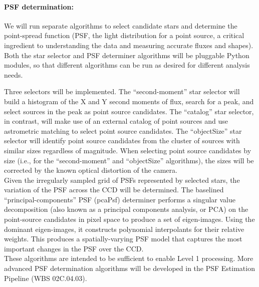 \documentclass[12pt]{article}
\newcommand{\wbsPSF}{WBS 02C.04.03}
\begin{document}
\paragraph{PSF determination:} We will run separate algorithms to select candidate stars and determine the point-spread function (PSF, the light distribution for a point source, a critical ingredient to understanding the data and measuring accurate fluxes and shapes).  Both the star selector and PSF determiner algorithms will be pluggable Python modules, so that different algorithms can be run as desired for different analysis needs.

Three selectors will be implemented. %
The ``second-moment'' star selector will build a histogram of the X and Y second moments of flux, search for a peak, and select sources in the peak as point source candidates.  The ``catalog'' star selector, in contrast, will make use of an external catalog of point sources and use astrometric matching to select point source candidates.  The ``objectSize'' star selector will identify point source candidates from the cluster of sources with similar sizes regardless of magnitude.  When selecting point source candidates by size (i.e., for the ``second-moment'' and ``objectSize'' algorithms), the sizes will be corrected by the known optical distortion of the camera.  %
\\

Given the irregularly sampled grid of PSFs represented by selected stars, the variation of the PSF across the CCD will be determined. The baselined ``principal-components'' PSF (pcaPsf) determiner performs a singular value decomposition (also known as a principal components analysis, or PCA) on the point-source candidates in pixel space to produce a set of eigen-images.  Using the dominant eigen-images, it constructs polynomial interpolants for their relative weights.  This produces a spatially-varying PSF model that captures the most important changes in the PSF over the CCD.
\\

These algorithms are intended to be sufficient to enable Level 1 processing. More advanced PSF determination algorithms will be developed in the PSF Estimation Pipeline (\wbsPSF).
\end{document}
